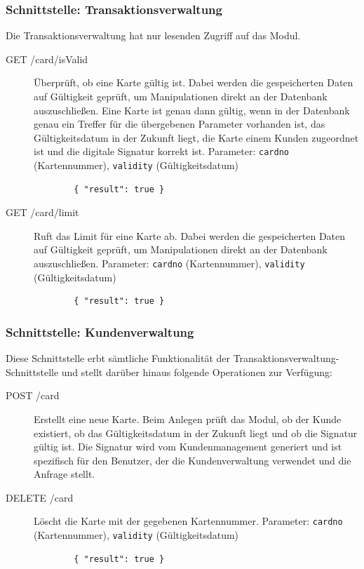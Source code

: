 \documentclass[12pt,a4paper,titlepage,oneside]{scrartcl}
\begin{document}
\subsubsection{Schnittstelle: Transaktionsverwaltung}
Die Transaktionsverwaltung hat nur lesenden Zugriff auf das Modul.
\begin{description}
	\item[GET /card/isValid]
		Überprüft, ob eine Karte gültig ist. Dabei werden die gespeicherten Daten auf Gültigkeit geprüft, um Manipulationen direkt an der Datenbank auszuschließen. Eine Karte ist genau dann gültig, wenn in der Datenbank genau ein Treffer für die übergebenen Parameter vorhanden ist, das Gültigkeitsdatum in der Zukunft liegt, die Karte einem Kunden zugeordnet ist und die digitale Signatur korrekt ist. Parameter: \texttt{cardno} (Kartennummer), \texttt{validity} (Gültigkeitsdatum)
		
		\begin{lstlisting}
		{ "result": true }
		\end{lstlisting}
		
	\item[GET /card/limit]
		Ruft das Limit für eine Karte ab. Dabei werden die gespeicherten Daten auf Gültigkeit geprüft, um Manipulationen direkt an der Datenbank auszuschließen. Parameter: \texttt{cardno} (Kartennummer), \texttt{validity} (Gültigkeitsdatum)
		
		\begin{lstlisting}
		{ "result": true }
		\end{lstlisting}
		
\end{description}

\subsubsection{Schnittstelle: Kundenverwaltung}
Diese Schnittstelle erbt sämtliche Funktionalität der Transaktionsverwaltung-Schnittstelle
und stellt darüber hinaus folgende Operationen zur Verfügung:

\begin{description}
	\item[POST /card]
		Erstellt eine neue Karte. Beim Anlegen prüft das Modul, ob der Kunde existiert, ob das Gültigkeitsdatum in der Zukunft liegt und ob die Signatur gültig ist. Die Signatur wird vom Kundenmanagement generiert und ist spezifisch für den Benutzer, der die Kundenverwaltung verwendet und die Anfrage stellt.

	\item[DELETE /card]
		Löscht die Karte mit der gegebenen Kartennummer. Parameter: \texttt{cardno} (Kartennummer), \texttt{validity} (Gültigkeitsdatum)
		
		\begin{lstlisting}
		{ "result": true }
		\end{lstlisting}

\end{description}
\end{document}
